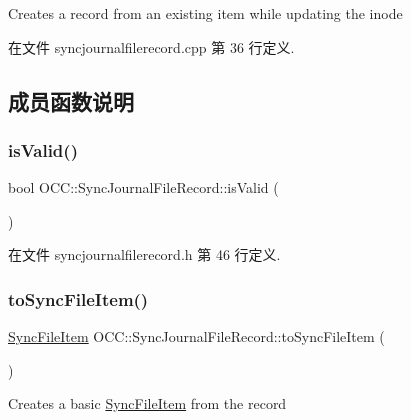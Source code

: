 Creates a record from an existing item while updating the inode 



在文件 syncjournalfilerecord.\+cpp 第 36 行定义.



\subsection{成员函数说明}
\mbox{\label{class_o_c_c_1_1_sync_journal_file_record_a7d81643e14103416a460474caa60a194}} 
\subsubsection{\texorpdfstring{is\+Valid()}{isValid()}}
{\footnotesize\ttfamily bool O\+C\+C\+::\+Sync\+Journal\+File\+Record\+::is\+Valid (\begin{DoxyParamCaption}{ }\end{DoxyParamCaption})}



在文件 syncjournalfilerecord.\+h 第 46 行定义.

\mbox{\label{class_o_c_c_1_1_sync_journal_file_record_a64135685550c37c21aa134fdf3cb8c1f}} 
\subsubsection{\texorpdfstring{to\+Sync\+File\+Item()}{toSyncFileItem()}}
{\footnotesize\ttfamily \hyperlink{class_o_c_c_1_1_sync_file_item}{Sync\+File\+Item} O\+C\+C\+::\+Sync\+Journal\+File\+Record\+::to\+Sync\+File\+Item (\begin{DoxyParamCaption}{ }\end{DoxyParamCaption})}

Creates a basic \hyperlink{class_o_c_c_1_1_sync_file_item}{Sync\+File\+Item} from the record

